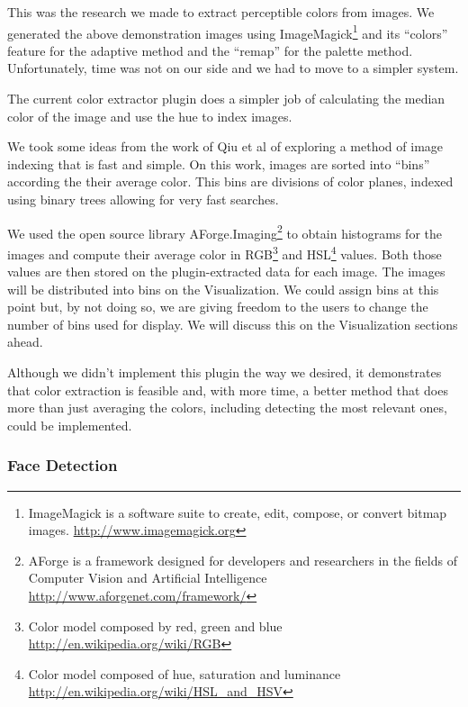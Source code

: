 This was the research we made to extract perceptible colors from images. We generated the above demonstration images using ImageMagick\footnote{ImageMagick is a software suite to create, edit, compose, or convert bitmap images. \url{http://www.imagemagick.org}} and its ``colors'' feature for the adaptive method and the ``remap'' for the palette method. Unfortunately, time was not on our side and we had to move to a simpler system. 

The current color extractor plugin does a simpler job of calculating the median color of the image and use the hue to index images.

We took some ideas from the work of Qiu et al\cite{Qiu:2007p1207} of exploring a method of image indexing that is fast and simple. On this work, images are sorted into ``bins'' according the their average color. This bins are divisions of color planes, indexed using binary trees allowing for very fast searches.

We used the open source library AForge.Imaging\footnote{AForge is a framework designed for developers and researchers in the fields of Computer Vision and Artificial Intelligence \url{http://www.aforgenet.com/framework/}} to obtain histograms for the images and compute their average color in RGB\footnote{Color model composed by red, green and blue \url{http://en.wikipedia.org/wiki/RGB}} and HSL\footnote{Color model composed of hue, saturation and luminance \url{http://en.wikipedia.org/wiki/HSL_and_HSV}} values. Both those values are then stored on the plugin-extracted data for each image. The images will be distributed into bins on the Visualization. We could assign bins at this point but, by not doing so, we are giving freedom to the users to change the number of bins used for display. We will discuss this on the Visualization sections ahead.


Although we didn't implement this plugin the way we desired, it demonstrates that color extraction is feasible and, with more time, a better method that does more than just averaging the colors, including detecting the most relevant ones, could be implemented. 





\subsubsection{Face Detection} %
\label{ssub:face_detection}

